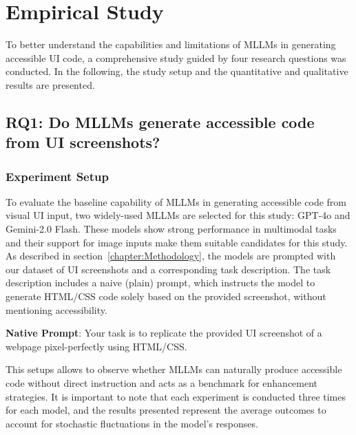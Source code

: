 \chapter{Empirical Study}\label{chapter:EmpiricalStudy}
To better understand the capabilities and limitations of 
MLLMs in generating accessible UI code, a comprehensive 
study guided by four research questions was conducted. 
In the following, the study setup and the quantitative and
qualitative results are presented.

\section{RQ1: Do MLLMs generate accessible code from UI screenshots?}
\subsection{Experiment Setup}
To evaluate the baseline capability of MLLMs in generating accessible
code from visual UI input, two widely-used MLLMs are 
selected for this study: GPT-4o and Gemini-2.0 Flash.
These models show strong performance in 
multimodal tasks and their support for image inputs make
them suitable candidates for this study.\newline
As described in section~\ref{chapter:Methodology}, the models are 
prompted with our dataset of UI screenshots and a corresponding 
task description. The task description includes a naive (plain)
prompt, which instructs the model to generate HTML/CSS code solely
based on the provided screenshot, without mentioning accessibility.


\begin{roundedbox}
\textbf{Native Prompt}: Your task is to replicate 
the provided UI screenshot of a webpage pixel-perfectly using 
HTML/CSS.
\end{roundedbox}

This setups allows to observe whether MLLMs can 
naturally produce accessible code without direct instruction 
and acts as a benchmark for enhancement strategies. 
It is important to note that each experiment is conducted three 
times for each model, and the results presented represent the average 
outcomes to account for stochastic fluctuations in the model's responses.


